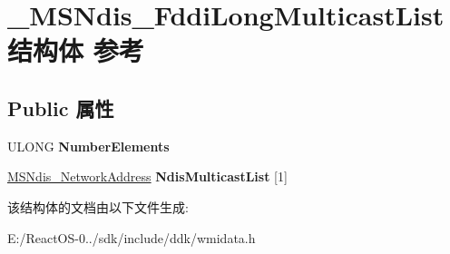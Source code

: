 \hypertarget{struct___m_s_ndis___fddi_long_multicast_list}{}\section{\+\_\+\+M\+S\+Ndis\+\_\+\+Fddi\+Long\+Multicast\+List结构体 参考}
\label{struct___m_s_ndis___fddi_long_multicast_list}
\subsection*{Public 属性}
\begin{DoxyCompactItemize}
\item 
\mbox{\label{struct___m_s_ndis___fddi_long_multicast_list_a5d593cb17075362703066ec99e01022d}} 
U\+L\+O\+NG {\bfseries Number\+Elements}
\item 
\mbox{\label{struct___m_s_ndis___fddi_long_multicast_list_ac4c9821e14a65f4079dc27279a80b57a}} 
\hyperlink{struct___m_s_ndis___network_address}{M\+S\+Ndis\+\_\+\+Network\+Address} {\bfseries Ndis\+Multicast\+List} \mbox{[}1\mbox{]}
\end{DoxyCompactItemize}


该结构体的文档由以下文件生成\+:\begin{DoxyCompactItemize}
\item 
E\+:/\+React\+O\+S-\/0../sdk/include/ddk/wmidata.\+h\end{DoxyCompactItemize}
